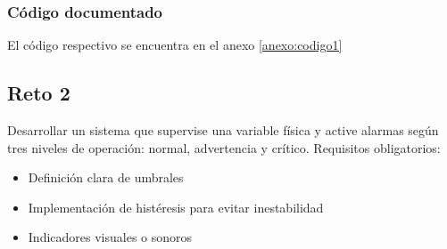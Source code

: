 \subsubsection{\textbf{Código documentado}}
El código respectivo se encuentra en el anexo \ref{anexo:codigo1}

\subsection{\textbf{Reto 2}} %
Desarrollar un sistema que supervise una variable física y active alarmas según tres niveles de operación: normal, advertencia y crítico. Requisitos obligatorios:
\begin{itemize}
    \item Definición clara de umbrales
    \item Implementación de histéresis para evitar inestabilidad
    \item Indicadores visuales o sonoros
\end{itemize}
\vspace{0,3cm}
